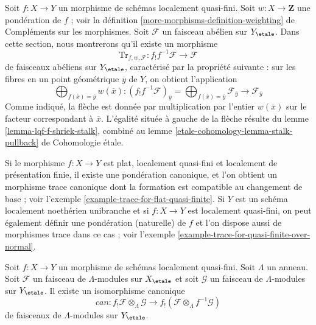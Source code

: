 \medskip\noindent
Soit $f : X \to Y$ un morphisme de schémas localement quasi-fini.
Soit $w : X \to \mathbf{Z}$ une pondération de $f$ ; voir la
définition \ref{more-morphisms-definition-weighting} de Compléments sur les morphismes.
Soit $\mathcal{F}$ un faisceau abélien sur $Y_\etale$.
Dans cette section, nous montrerons qu'il existe un morphisme
$$
\text{Tr}_{f, w, \mathcal{F}} :
f_!f^{-1}\mathcal{F}
\longrightarrow
\mathcal{F}
$$
de faisceaux abéliens sur $Y_\etale$, caractérisé par la propriété suivante :
sur les fibres en un point géométrique $\overline{y}$ de $Y$, on obtient l'application
$$
\bigoplus\nolimits_{f(\overline{x}) = \overline{y}} w(\overline{x}) :
(f_!f^{-1}\mathcal{F})_{\overline{y}} =
\bigoplus\nolimits_{f(\overline{x}) = \overline{y}}
\mathcal{F}_{\overline{y}}
\longrightarrow
\mathcal{F}_{\overline{y}}
$$
Comme indiqué, la flèche est donnée par multiplication par l'entier
$w(\overline{x})$ sur le facteur correspondant à $\overline{x}$.
L'égalité située à gauche de la flèche résulte du
lemme \ref{lemma-lqf-f-shriek-stalk}, combiné au
lemme \ref{etale-cohomology-lemma-stalk-pullback} de Cohomologie étale.

\medskip\noindent
Si le morphisme $f : X \to Y$ est plat, localement quasi-fini et localement de
présentation finie, il existe une pondération canonique,
et l'on obtient un morphisme trace canonique dont la formation est
compatible au changement de base ; voir
l'exemple \ref{example-trace-for-flat-quasi-finite}.
Si $Y$ est un schéma localement noethérien unibranche et si $f : X \to Y$
est localement quasi-fini, on peut également définir une pondération
(naturelle) de $f$ et l'on dispose aussi de morphismes trace dans ce cas ; voir
l'exemple \ref{example-trace-for-quasi-finite-over-normal}.

\begin{lemma}
\label{lemma-f-shriek-projection}
Soit $f : X \to Y$ un morphisme de schémas localement quasi-fini.
Soit $\Lambda$ un anneau.
Soit $\mathcal{F}$ un faisceau de $\Lambda$-modules sur $X_\etale$
et soit $\mathcal{G}$ un faisceau de $\Lambda$-modules sur $Y_\etale$.
Il existe un isomorphisme canonique
$$
can :
f_!\mathcal{F} \otimes_\Lambda \mathcal{G}
\longrightarrow
f_!(\mathcal{F} \otimes_\Lambda f^{-1}\mathcal{G})
$$
de faisceaux de $\Lambda$-modules sur $Y_\etale$.
\end{lemma}


